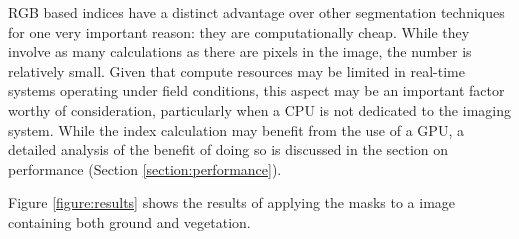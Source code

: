 \documentclass[letterpaper]{report}
\begin{document}
{RGB based indices have a distinct advantage over other segmentation techniques for one very important reason: they are computationally cheap. While they involve as many calculations as there are pixels in the image, the number is relatively small. Given that compute resources may be limited in real-time systems operating under field conditions, this aspect may be an important factor worthy of consideration, particularly when a CPU is not dedicated to the imaging system. While the index calculation may benefit from the use of  a GPU, a detailed analysis of the benefit of doing so is discussed in the section on performance (Section \ref{section:performance}).

Figure \ref{figure:results} shows the results of applying the masks to a image containing both ground and vegetation.

}
\end{document}
